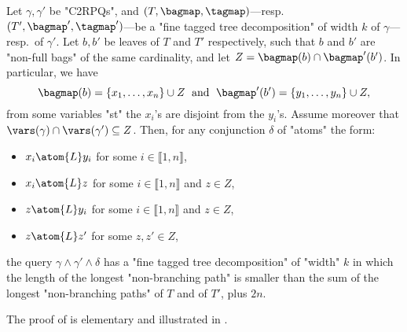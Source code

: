 \begin{proposition}
    \AP\label{prop:connecting-tree-decompositions}
    Let $\gamma,\gamma'$ be "C2RPQs",
    and $(T,\bagmap,\tagmap)$---resp.\ $(T',\bagmap',\tagmap')$---be
	a "fine tagged tree decomposition" of width $k$ of $\gamma$---resp.\ of $\gamma'$.
    Let $b, b'$ be leaves of $T$ and $T'$ respectively, such that $b$ and $b'$ are "non-full bags"
	of the same cardinality,
	and let $Z = \bagmap(b) \cap \bagmap'(b')$. In particular, we have
    \[
        \bagmap(b) = \{x_1,\hdots,x_n\}\cup Z
        \;\text{ and }\;
        \bagmap'(b') = \{y_1,\hdots,y_n\}\cup Z,
    \]
	from some variables "st" the $x_i$'s are disjoint from the $y_i$'s.
	Assume moreover that $\vars(\gamma) \cap \vars(\gamma') \subseteq Z$.
    Then, for any conjunction $\delta$ of "atoms" the form:
	\begin{itemize}
		\item $x_i \atom{L} y_i$ for some $i \in \lBrack 1, n \rBrack$,
		\item $x_i \atom{L} z$ for some $i \in \lBrack 1, n \rBrack$ and $z\in Z$,
		\item $z \atom{L} y_i$ for some $i \in \lBrack 1, n \rBrack$ and $z\in Z$,
		\item $z \atom{L} z'$ for some $z, z'\in Z$,
	\end{itemize}
	the query $\gamma \land \gamma' \land \delta$
	has a "fine tagged tree decomposition"
    of "width" $k$ in which the length of the longest "non-branching path" is smaller
    than the sum of the longest "non-branching paths" of $T$ and of $T'$, plus $2n$.
\end{proposition}

The proof of  is elementary and illustrated in .

